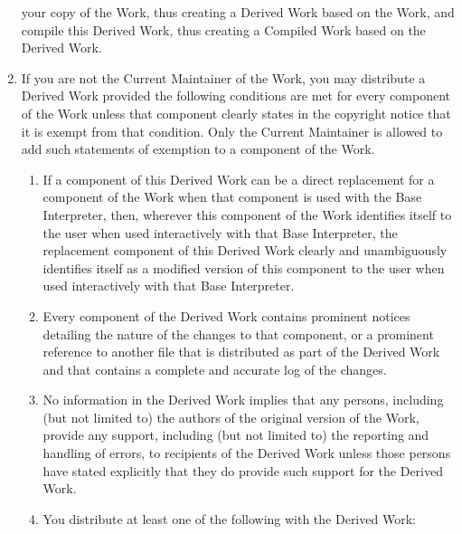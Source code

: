 \begin{LPPLicense}
\begin{enumerate}
            your copy of the Work, thus creating a Derived Work based on the
            Work, and compile this Derived Work, thus creating a Compiled Work
            based on the Derived Work.
        \item\label{LPPL:item:conditions} If you are not the Current Maintainer
            of the Work, you may distribute a Derived Work provided the
            following conditions are met for every component of the Work unless
            that component clearly states in the copyright notice that it is
            exempt from that condition.  Only the Current Maintainer is allowed
            to add such statements of exemption to a component of the Work.
            \begin{enumerate}
                \item If a component of this Derived Work can be a direct
                    replacement for a component of the Work when that component
                    is used with the Base Interpreter, then, wherever this
                    component of the Work identifies itself to the user when
                    used interactively with that Base Interpreter, the
                    replacement component of this Derived Work clearly and
                    unambiguously identifies itself as a modified version of
                    this component to the user when used interactively with
                    that Base Interpreter.
                \item Every component of the Derived Work contains prominent
                    notices detailing the nature of the changes to that
                    component, or a prominent reference to another file that is
                    distributed as part of the Derived Work and that contains a
                    complete and accurate log of the changes.
                \item No information in the Derived Work implies that any
                    persons, including (but not limited to) the authors of the
                    original version of the Work, provide any support,
                    including (but not limited to) the reporting and handling
                    of errors, to recipients of the Derived Work unless those
                    persons have stated explicitly that they do provide such
                    support for the Derived Work.
                \item You distribute at least one of the following with the
                    Derived Work:

\end{enumerate}
\end{enumerate}
\end{LPPLicense}
